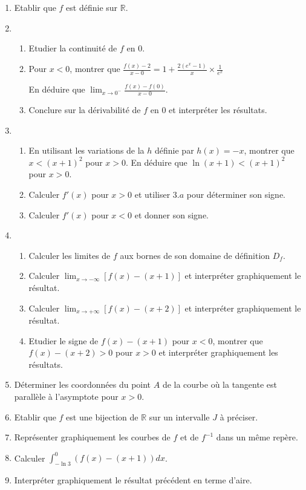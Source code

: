 \documentclass[12pt,a4paper]{article}
\begin{document}
\begin{enumerate}
    \item Etablir que \( f \) est définie sur \( \mathbb{R} \).
    \item 
    \begin{enumerate}
        \item Etudier la continuité de \( f \) en \( 0 \).
        \item Pour \( x < 0 \), montrer que  
        \( \frac{f(x) - 2}{x - 0} = 1 + \frac{2(e^x - 1)}{x} \times \frac{1}{e^x} \) 
         
        En déduire que  
        \( \lim_{x \to 0^-} \frac{f(x) - f(0)}{x - 0} \).
        \item Conclure sur la dérivabilité de \( f \) en \( 0 \) et interpréter les résultats.
    \end{enumerate}
    \item
    \begin{enumerate}
        \item En utilisant les variations de la \( h \) définie par \( h(x) = -x \), montrer que \( x < (x+1)^2 \) pour \( x > 0 \). En déduire que  
        \( \ln(x+1) < (x+1)^2 \) pour \( x > 0 \).
        \item Calculer \( f'(x) \) pour \( x > 0 \) et utiliser \( 3.a \) pour déterminer son signe.
        \item Calculer \( f'(x) \) pour \( x < 0 \) et donner son signe.
    \end{enumerate}
    \item
    \begin{enumerate}
        \item Calculer les limites de \( f \) aux bornes de son domaine de définition \( D_f \).
        \item Calculer  
        \( \lim_{x \to -\infty} [f(x) - (x+1)] \)  
        et interpréter graphiquement le résultat.
        \item Calculer  
        \( \lim_{x \to +\infty} [f(x) - (x+2)] \)  
        et interpréter graphiquement le résultat.
        \item Etudier le signe de \( f(x) - (x+1) \) pour \( x < 0 \), montrer que  
        \( f(x) - (x+2) > 0 \)  
        pour \( x > 0 \) et interpréter graphiquement les résultats.
    \end{enumerate}
    \item Déterminer les coordonnées du point \( A \) de la courbe où la tangente est parallèle à l’asymptote pour \( x > 0 \).
    \item Etablir que \( f \) est une bijection de \( \mathbb{R} \) sur un intervalle \( J \) à préciser.
    \item Représenter graphiquement les courbes de \( f \) et de \( f^{-1} \) dans un même repère.
    \item Calculer \( \int_{-\ln 3}^{0} (f(x) - (x+1))dx \).
    \item Interpréter graphiquement le résultat précédent en terme d’aire.
\end{enumerate}
\end{document}
